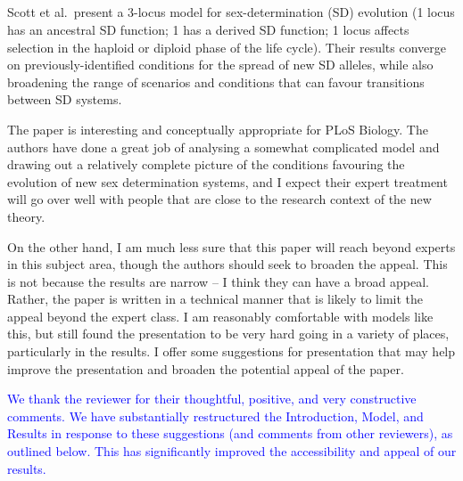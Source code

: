 \documentclass[10pt,letterpaper]{article}
\begin{document}
\noindent\subsection{}

Scott et al.\ present a 3-locus model for sex-determination (SD) evolution (1 locus has an ancestral SD function; 1 has a derived SD function; 1 locus affects selection in the haploid or diploid phase of the life cycle). Their results converge on previously-identified conditions for the spread of new SD alleles, while also broadening the range of scenarios and conditions that can favour transitions between SD systems.

The paper is interesting and conceptually appropriate for PLoS Biology. The authors have done a great job of analysing a somewhat complicated model and drawing out a relatively complete picture of the conditions favouring the evolution of new sex determination systems, and I expect their expert treatment will go over well with people that are close to the research context of the new theory.

On the other hand, I am much less sure that this paper will reach beyond experts in this subject area, though the authors should seek to broaden the appeal. This is not because the results are narrow -- I think they can have a broad appeal. Rather, the paper is written in a technical manner that is likely to limit the appeal beyond the expert class. I am reasonably comfortable with models like this, but still found the presentation to be very hard going in a variety of places, particularly in the results. I offer some suggestions for presentation that may help improve the presentation and broaden the potential appeal of the paper.

\textcolor{blue}{
We thank the reviewer for their thoughtful, positive, and very constructive comments. We have substantially restructured the Introduction, Model, and Results in response to these suggestions (and comments from other reviewers), as outlined below. 
This has significantly improved the accessibility and appeal of our results. 
}
\end{document}
